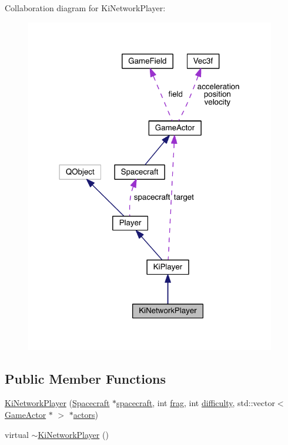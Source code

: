 Collaboration diagram for Ki\+Network\+Player\+:\nopagebreak
\begin{figure}[H]
\begin{center}
\leavevmode
\includegraphics[width=310pt]{class_ki_network_player__coll__graph}
\end{center}
\end{figure}
\subsection*{Public Member Functions}
\begin{DoxyCompactItemize}
\item 
\hyperlink{class_ki_network_player_ad6c79d301f1a11801e6a1dadd5a1503a}{Ki\+Network\+Player} (\hyperlink{class_spacecraft}{Spacecraft} $\ast$\hyperlink{class_player_a7cc88a054d2329b1ca7472a86b2030ca}{spacecraft}, int \hyperlink{class_player_a9528a6db252f2fe947fd7d9189837aec}{frag}, int \hyperlink{class_ki_player_af7ba0444a46f7d46b6af4b31a2808c2a}{difficulty}, std\+::vector$<$ \hyperlink{class_game_actor}{Game\+Actor} $\ast$ $>$ $\ast$\hyperlink{class_ki_player_a0da596a3550eaccd42d70c915b588303}{actors})
\item 
virtual \hyperlink{class_ki_network_player_a17b29f3b7e63969d96ab0e5328c932c9}{$\sim$\+Ki\+Network\+Player} ()
\end{DoxyCompactItemize}
